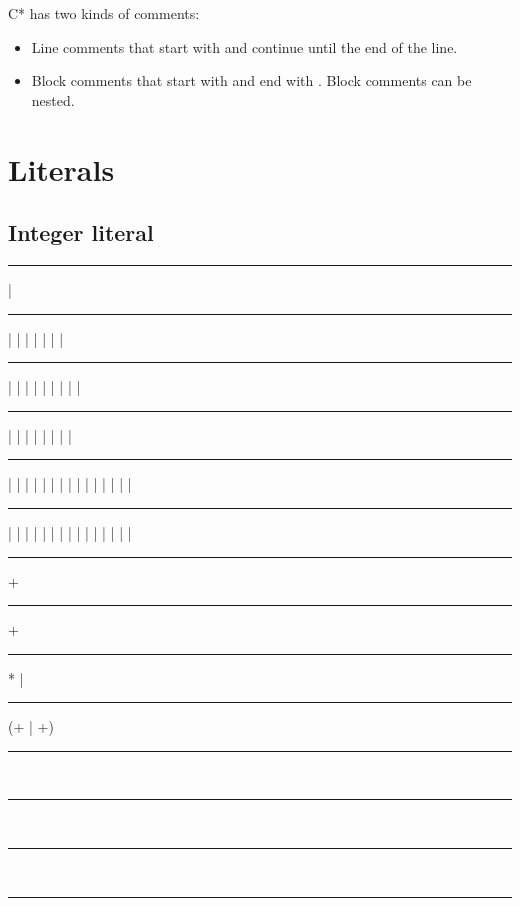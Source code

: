 C* has two kinds of comments:

\begin{itemize}
    \item Line comments that start with \code{//} and continue until the end of the line.
    \item Block comments that start with \code{/*} and end with \code{*/}. Block comments can be nested.
\end{itemize}

\section{Literals}

\subsection{Integer literal}

\begin{grammar}
    \rule{binary-digit}  | \\
    \rule{octal-digit}  |  |  |  |  |  |  | \\
    \rule{decimal-digit}  |  |  |  |  |  |  |  |  | \\
    \rule{nonzero-decimal-digit}  |  |  |  |  |  |  |  | \\
    \rule{lowercase-hex-digit}  |  |  |  |  |  |  |  |  |  |  |  |  |  |  | \\
    \rule{uppercase-hex-digit}  |  |  |  |  |  |  |  |  |  |  |  |  |  |  | 

    \rule{binary-integer-literal} +\\
    \rule{octal-integer-literal} +\\
    \rule{decimal-integer-literal}  * | \\
    \rule{hex-integer-literal} (+ | +)

    \rule{integer-literal} \\
    \rule{integer-literal} \\
    \rule{integer-literal} \\
    \rule{integer-literal} 
\end{grammar}

